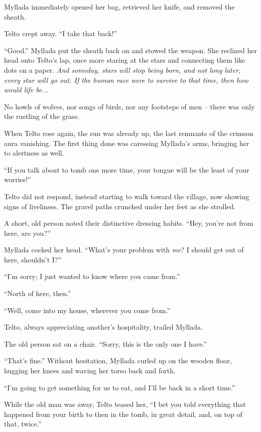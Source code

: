 Myllada immediately opened her bag, retrieved her knife, and removed the sheath.

Telto crept away. ``I take that back!''

``Good.'' Myllada put the sheath back on and stowed the weapon. She reclined her head onto Telto's lap, once more staring at the stars and connecting them like dots on a paper. \emph{And someday, stars will stop being born, and not long later, every star will go out. If the human race were to survive to that time, then how would life be...}

No howls of wolves, nor songs of birds, nor any footsteps of men -- there was only the rustling of the grass.

\centeredstars

When Telto rose again, the sun was already up, the last remnants of the crimson aura vanishing. The first thing done was caressing Myllada's arms, bringing her to alertness as well.

``If you talk about to tomb one more time, your tongue will be the least of your worries!''

Telto did not respond, instead starting to walk toward the village, now showing signs of liveliness. The gravel paths crunched under her feet as she strolled.

A short, old person noted their distinctive dressing habits. ``Hey, you're not from here, are you?''

Myllada cocked her head. ``What's your problem with \emph{me}? I should get out of here, shouldn't I?''

``I'm sorry; I just wanted to know where you came from.''

``North of here, then.''

``Well, come into my house, wherever you come from.''

Telto, always appreciating another's hospitality, trailed Myllada.

The old person sat on a chair. ``Sorry, this is the only one I have.''

``That's fine.'' Without hesitation, Myllada curled up on the wooden floor, hugging her knees and waving her torso back and forth.

``I'm going to get something for us to eat, and I'll be back in a short time.''

While the old man was away, Telto teased her, ``I bet you told everything that happened from your birth to then in the tomb, in great detail, and, on top of that, twice.''

